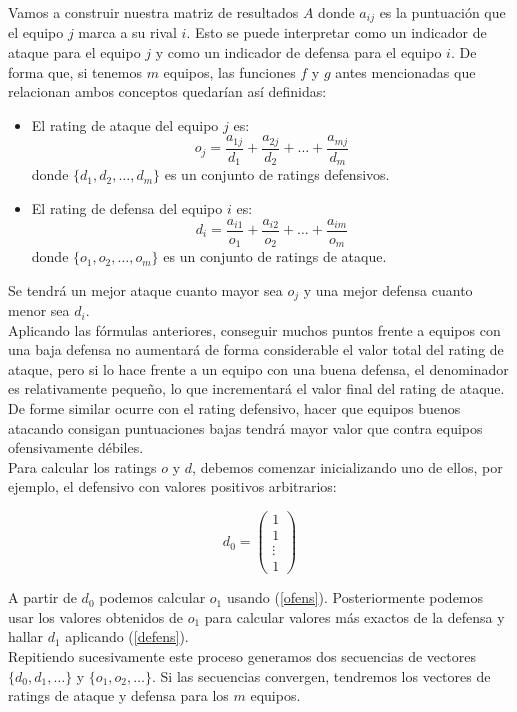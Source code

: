 Vamos a construir nuestra matriz de resultados $A$ donde $a_{ij}$ es la puntuación que el equipo $j$ marca a su rival $i$. Esto se puede interpretar como un indicador de ataque para el equipo $j$ y como un indicador de defensa para el equipo $i$. De forma que, si tenemos $m$ equipos, las funciones $f$ y $g$ antes mencionadas que relacionan ambos conceptos quedarían así definidas: 
\begin{itemize}
	\item El rating de ataque del equipo $j$ es:
	\begin{equation}
	o_{j} = \dfrac{a_{1j}}{d_{1}} + \dfrac{a_{2j}}{d_{2}} + \dots + \dfrac{a_{mj}}{d_{m}}  \label{ofens}
	\end{equation} 
	donde $\{d_{1},d_{2}, \dots ,d_{m}\}$ es un conjunto de ratings defensivos. 
	\item El rating de defensa del equipo $i$ es:
	\begin{equation}
	d_{i} = \dfrac{a_{i1}}{o_{1}} + \dfrac{a_{i2}}{o_{2}} + \dots + \dfrac{a_{im}}{o_{m}}  \label{defens}
	\end{equation} 
	donde $\{o_{1},o_{2}, \dots ,o_{m}\}$ es un conjunto de ratings de ataque. 
\end{itemize}

Se tendrá un mejor ataque cuanto mayor sea $o_{j}$ y una mejor defensa cuanto menor sea $d_{i}$.\\
Aplicando las fórmulas anteriores, conseguir muchos puntos frente a equipos con una baja defensa no aumentará de forma considerable el valor total del rating de ataque, pero si lo hace frente a un equipo con una buena defensa, el denominador es relativamente pequeño, lo que incrementará el valor final del rating de ataque. De forme similar ocurre con el rating defensivo, hacer que equipos buenos atacando consigan puntuaciones bajas tendrá mayor valor que contra equipos ofensivamente débiles.\\

Para calcular los ratings $o$ y $d$, debemos comenzar inicializando uno de ellos, por ejemplo, el defensivo con valores positivos arbitrarios:

\[d_{0}=
\left(\begin{array}{c}
1\\
1\\
\vdots \\
1
\end{array} \right)
\]

A partir de $d_{0}$ podemos calcular $o_{1}$ usando (\ref{ofens}). Posteriormente podemos usar los valores obtenidos de $o_{1}$ para calcular valores más exactos de la defensa y hallar $d_{1}$ aplicando (\ref{defens}).\\
Repitiendo sucesivamente este proceso generamos dos secuencias de vectores $\{d_{0},d_{1},\dots\}$ y $\{o_{1},o_{2},\dots\}$. Si las secuencias convergen, tendremos los vectores de ratings de ataque y defensa para los $m$ equipos.
 
